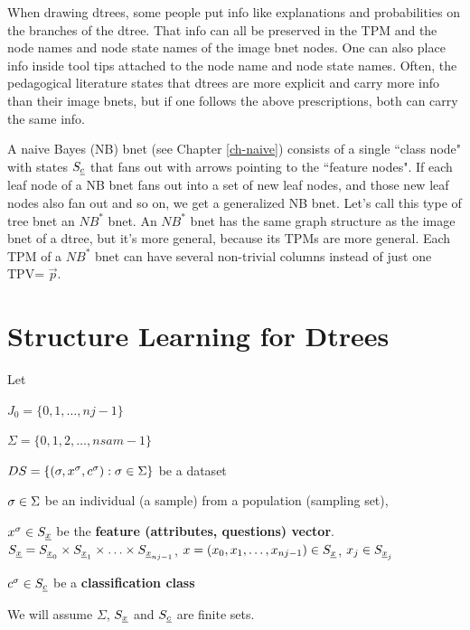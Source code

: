 When drawing dtrees,
some people put
info 
like explanations 
and probabilities on the
branches
of  the dtree.
That
info can all
be preserved
in the TPM
and  the
node names and
 node state names
of the image bnet nodes.
One can also place info
inside tool tips attached to
the node name and node state names.
Often,
the pedagogical literature
states that 
dtrees are more explicit and  
carry
more info than their
image bnets,
but if one 
follows the above
prescriptions,
both can carry
the same info.



A naive Bayes (NB) bnet 
(see Chapter \ref{ch-naive})
consists of a single ``class node"
with states $S_{\underline{c}}$ that fans
out with arrows 
pointing to the
``feature nodes".
If each leaf node
of a NB bnet
fans out into 
a set of new leaf
nodes, and those new
leaf nodes
also
fan out
and so on,
we get a 
generalized NB bnet.
Let's call
this type of tree bnet an $NB^*$ bnet.
An $NB^*$ bnet
has the same graph structure
as the image bnet of a dtree,
but it's more general,
because its 
TPMs are more general. 
Each 
TPM of a $NB^*$ bnet
 can have several non-trivial
columns instead of just one
TPV= $\vec{p}$.


\section{Structure Learning for  Dtrees}\label{sec-dtree-sl}



Let

$J_0=\{0,1, \ldots, nj-1\}$

$\Sigma=\{0,1,2, \ldots,nsam-1\}$

$DS=\{(\sigma, x^\sigma, c^\sigma): \sigma\in \Sigma\}$ be a dataset

$\sigma\in \Sigma$ be an individual (a sample)
from a population (sampling set), 

$x^\sigma\in S_{\underline{x}}$ be the {\bf
feature (attributes, questions) vector}.
$S_{\underline{x}}= S_{{\underline{x}}_0}\times S_{{\underline{x}}_1}
\times\ldots\times S_{{\underline{x}}_{nj-1}}$,
$x=(x_0, x_1, \ldots, x_{nj-1})\in S_{\underline{x}}$, 
$x_j\in S_{{\underline{x}}_j}$


$c^\sigma\in S_{\underline{c}}$ be a {\bf classification class}

We will
assume $\Sigma$, $S_{\underline{x}}$ and $S_{\underline{c}}$ are finite sets.

